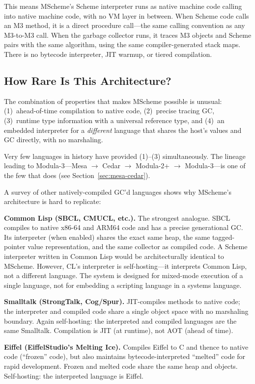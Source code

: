 \documentclass[11pt]{article}
\begin{document}
This means MScheme's Scheme interpreter runs as native machine code
calling into native machine code, with no VM layer in between.  When
Scheme code calls an M3 method, it is a direct procedure call---the
same calling convention as any M3-to-M3 call.  When the garbage
collector runs, it traces M3 objects and Scheme pairs with the same
algorithm, using the same compiler-generated stack maps.  There is no
bytecode interpreter, JIT warmup, or tiered compilation.


\subsection{How Rare Is This Architecture?}
\label{sec:how-rare}

The combination of properties that makes MScheme possible is unusual:
(1)~ahead-of-time compilation to native code, (2)~precise tracing GC,
(3)~runtime type information with a universal reference type, and
(4)~an embedded interpreter for a \emph{different} language that
shares the host's values and GC directly, with no marshaling.

Very few languages in history have provided (1)--(3) simultaneously.
The lineage leading to Modula-3---Mesa $\to$ Cedar $\to$ Modula-2+
$\to$ Modula-3---is one of the few that does (see
Section~\ref{sec:mesa-cedar}).

A survey of other natively-compiled GC'd languages shows why MScheme's
architecture is hard to replicate:

\textbf{Common Lisp (SBCL, CMUCL, etc.).}  The strongest analogue.
SBCL compiles to native x86-64 and ARM64 code and has a precise
generational GC.  Its interpreter (when enabled) shares the exact same
heap, the same tagged-pointer value representation, and the same
collector as compiled code.  A Scheme interpreter written in Common
Lisp would be architecturally identical to MScheme.  However, CL's
interpreter is self-hosting---it interprets Common Lisp, not a
different language.  The system is designed for mixed-mode execution of
a single language, not for embedding a scripting language in a systems
language.

\textbf{Smalltalk (StrongTalk, Cog/Spur).}  JIT-compiles methods to
native code; the interpreter and compiled code share a single object
space with no marshaling boundary.  Again self-hosting: the
interpreted and compiled languages are the same Smalltalk.
Compilation is JIT (at runtime), not AOT (ahead of time).

\textbf{Eiffel (EiffelStudio's Melting Ice).}  Compiles Eiffel to C
and thence to native code (``frozen'' code), but also maintains
bytecode-interpreted ``melted'' code for rapid development.  Frozen
and melted code share the same heap and objects.  Self-hosting: the
interpreted language is Eiffel.
\end{document}

